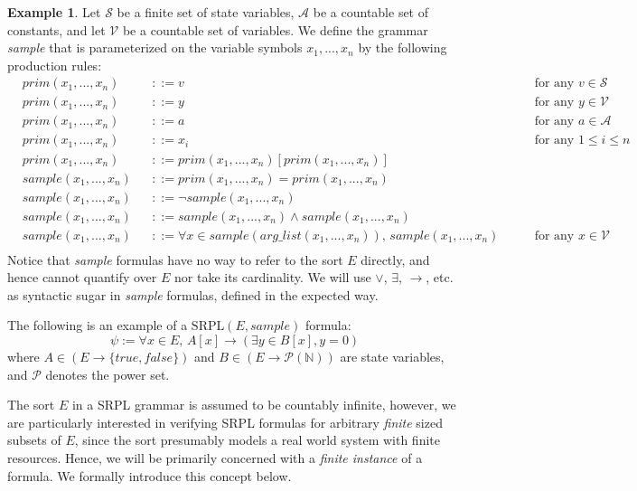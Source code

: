 \documentclass[12pt]{article}
\theoremstyle{definition}
\newtheorem{example}{Example}
\theoremstyle{remark}
\newcommand{\SRPL}{\text{SRPL}}
\begin{document}
\begin{example}
  Let $\mathcal{S}$ be a finite set of state variables, $\mathcal{A}$ be a countable set of constants, and let $\mathcal{V}$ be a countable set of variables.  We define the grammar \textit{sample} that is parameterized on the variable symbols $x_1,...,x_n$ by the following production rules:
  \begin{align*}
    &prim(x_1,...,x_n)& &::= v \qquad &\text{for any } v \in \mathcal{S}\\
    &prim(x_1,...,x_n)& &::= y \qquad &\text{for any } y \in \mathcal{V}\\
    &prim(x_1,...,x_n)& &::= a \qquad &\text{for any } a \in \mathcal{A}\\
    &prim(x_1,...,x_n)& &::= x_i \qquad &\text{for any } 1 \leq i \leq n\\
    &prim(x_1,...,x_n)& &::= prim(x_1,...,x_n)[prim(x_1,...,x_n)]\\
    &sample(x_1,...,x_n)& &::= prim(x_1,...,x_n) = prim(x_1,...,x_n)\\
    &sample(x_1,...,x_n)& &::= \neg sample(x_1,...,x_n)\\
    &sample(x_1,...,x_n)& &::= sample(x_1,...,x_n) \land sample(x_1,...,x_n)\\
    &sample(x_1,...,x_n)& &::= \forall x \in sample(arg\_list(x_1,...,x_n)), \, sample(x_1,...,x_n) \qquad &\text{for any } x \in \mathcal{V}\\
  \end{align*}
  Notice that \textit{sample} formulas have no way to refer to the sort $E$ directly, and hence cannot quantify over $E$ nor take its cardinality.  We will use $\lor$, $\exists$, $\rightarrow$, etc. as syntactic sugar in \textit{sample} formulas, defined in the expected way.

  The following is an example of a $\SRPL(E,sample)$ formula:
  $$\psi := \forall x \in E, \, A[x] \rightarrow (\exists y \in B[x], y = 0)$$
  where $A \in (E \to \{true,false\})$ and $B \in (E \to \mathcal{P}(\mathbb{N}))$ are state variables, and $\mathcal{P}$ denotes the power set.
\end{example}

The sort $E$ in a SRPL grammar is assumed to be countably infinite, however, we are particularly interested in verifying SRPL formulas for arbitrary \textit{finite} sized subsets of $E$, since the sort presumably models a real world system with finite resources.  Hence, we will be primarily concerned with a \textit{finite instance} of a formula.  We formally introduce this concept below.
\end{document}
